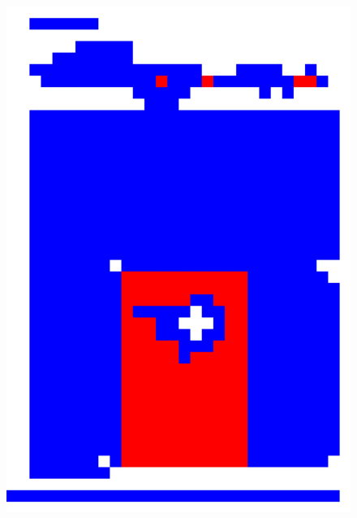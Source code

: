 \documentclass{book}
\begin{document}
\begin{figure}[H]
\begin{center}
\includegraphics[scale=0.06]{images/50_res_hog_hsv_kmeans.jpg}

\end{center}
\end{figure}
\end{document}
